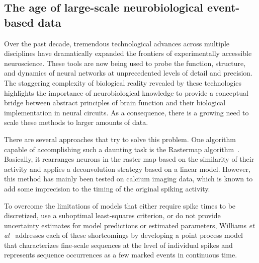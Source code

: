 \documentclass[runningheads]{llncs}
\begin{document}
\subsection{The age of large-scale neurobiological event-based data}
% 
Over the past decade, tremendous technological advances across multiple disciplines have dramatically expanded the frontiers of experimentally accessible neuroscience. %
These tools are now being used to probe the function, structure, and dynamics of neural networks at unprecedented levels of detail and precision. The staggering complexity of biological reality revealed by these technologies highlights the importance of neurobiological knowledge to provide a conceptual bridge between abstract principles of brain function and their biological implementation in neural circuits. As a consequence, there is a growing need to scale these methods to larger amounts of data. 

There are several approaches that try to solve this problem. One algorithm capable of accomplishing such a daunting task is the Rastermap algorithm~\cite{pachitariu_robustness_2018}. Basically, it rearranges neurons in the raster map based on the similarity of their activity and applies a deconvolution strategy based on a linear model. However, this method has mainly been tested on calcium imaging data, which is known to add some imprecision to the timing of the original spiking activity. 

To overcome the limitations of models that either require spike times to be discretized, use a suboptimal least-squares criterion, or do not provide uncertainty estimates for model predictions or estimated parameters, Williams {\it et al}~\cite{williams_point_2020} addresses each of these shortcomings by developing a point process model that characterizes fine-scale sequences at the level of individual spikes and represents sequence occurrences as a few marked events in continuous time. %
%
\end{document}
